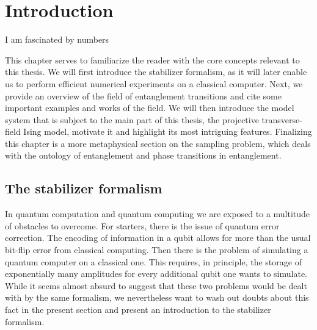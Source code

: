 \chapter{Introduction}
\label{ch:basics}
\epigraph{I am fascinated by numbers}{
\citeauthor{baron-cohenAutismSpectrumQuotientAQ2001}}


%
%


%
%
%

This chapter serves to familiarize the reader with the core concepts relevant
to this thesis. We will first introduce the stabilizer formalism, as it will
later enable us to perform efficient numerical experiments on a classical
computer. Next, we provide an overview of the field of entanglement transitions
and cite some important examples and works of the field. We will then introduce
the model system that is subject to the main part of this thesis, the
projective transverse-field Ising model, motivate it and highlight its most
intriguing features. Finalizing this chapter is a more metaphysical section on
the sampling problem, which deals with the ontology of entanglement and phase
transitions in entanglement.
\newpage
\section{The stabilizer formalism}\label{sec:stab-basics}
In quantum computation and quantum computing we are exposed to a multitude of
obstacles to overcome. For starters, there is the issue of quantum error
correction. The encoding of information in a qubit allows for more than the
usual bit-flip error from classical computing. Then there is the problem of
simulating a quantum computer on a classical one. This requires, in principle,
the storage of exponentially many amplitudes for every additional qubit one
wants to simulate. While it seems almost absurd to suggest that these two
problems would be dealt with by the same formalism, we nevertheless want to
wash out doubts about this fact in the present section and present an
introduction to the stabilizer formalism.

